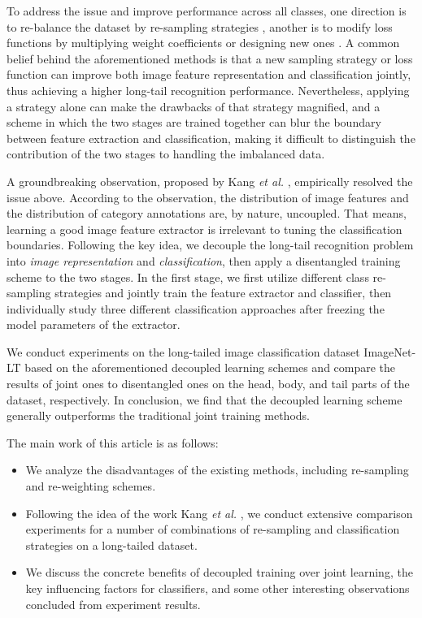 \documentclass{article}
\begin{document}
To address the issue and improve performance across all classes, one direction is to re-balance the dataset by re-sampling strategies \cite{burnaev2015influence,chawla2002smote,estabrooks2004multiple,huang2016learning,pereira2021toward}, another is to modify loss functions by multiplying weight coefficients \cite{cao2019learning,koziarski2021two,zhang2021mining} or designing new ones \cite{cui2019class,lin2017focal,wang2021adaptive}. A common belief behind the aforementioned methods is that a new sampling strategy or loss function can improve both image feature representation and classification jointly, thus achieving a higher long-tail recognition performance. Nevertheless, applying a strategy alone can make the drawbacks of that strategy magnified, and a scheme in which the two stages are trained together can blur the boundary between feature extraction and classification, making it difficult to distinguish the contribution of the two stages to handling the imbalanced data.

A groundbreaking observation, proposed by Kang \textit{et al.} \cite{kang2019decoupling}, empirically resolved the issue above. According to the observation, the distribution of image features and the distribution of category annotations are, by nature, uncoupled. That means, learning a good image feature extractor is irrelevant to tuning the classification boundaries. Following the key idea, we decouple the long-tail recognition problem into \textit{image representation} and \textit{classification}, then apply a disentangled training scheme to the two stages. In the first stage, we first utilize different class re-sampling strategies and jointly train the feature extractor and classifier, then individually study three different classification approaches after freezing the model parameters of the extractor.

We conduct experiments on the long-tailed image classification dataset ImageNet-LT based on the aforementioned decoupled learning schemes and compare the results of joint ones to disentangled ones on the head, body, and tail parts of the dataset, respectively. In conclusion, we find that the decoupled learning scheme generally outperforms the traditional joint training methods.

The main work of this article is as follows:
\begin{itemize}
    \item We analyze the disadvantages of the existing methods, including re-sampling and re-weighting schemes.
    \item Following the idea of the work Kang \textit{et al.} \cite{kang2019decoupling}, we conduct extensive comparison experiments for a number of combinations of re-sampling and classification strategies on a long-tailed dataset.
    \item We discuss the concrete benefits of decoupled training over joint learning, the key influencing factors for classifiers, and some other interesting observations concluded from experiment results.
\end{itemize}
\end{document}
